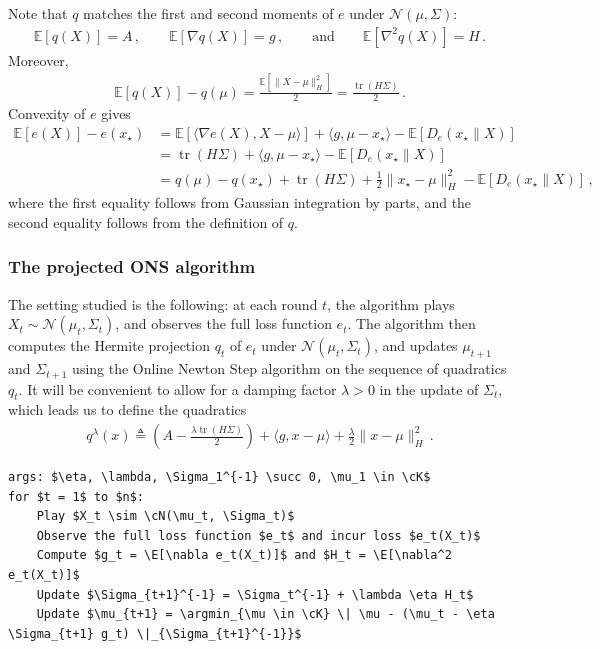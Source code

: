 \documentclass{article}
\theoremstyle{plain}
\theoremstyle{definition}
\theoremstyle{plain}
\newcommand{\tr}{\operatorname{tr}}
\newcommand{\argmin}{\operatornamewithlimits{arg\,min}}
\newcommand{\E}{\mathbb E}
\newcommand{\cN}{\mathcal N}
\newcommand{\cK}{\mathcal K}
\begin{document}
Note that $q$ matches the first and second moments of $e$ under $\cN(\mu, \Sigma)$:
\begin{align}
    \E[q(X)]           = A\,, \qquad
    \E[\nabla q(X)]    = g\,, \qquad\text{and}\qquad
    \E[\nabla^2 q(X)]  = H\,.
\end{align}
Moreover,
\begin{align}
    \E[q(X)] - q(\mu) = \frac{\E[\|X-\mu\|^2_H]}{2} = \frac{\tr(H\Sigma)}{2}\,.
\end{align}
Convexity of $e$ gives
\begin{align}
    \E[e(X)] - e(x_\star)
     & =
    \E\left[\langle \nabla e(X), X - \mu\rangle\right] + \langle g, \mu - x_\star\rangle
    - \E[D_e(x_\star \| X)]
    \label{eq:regret_switch_convex}
    \\
     & =
    \tr(H\Sigma) + \langle g, \mu - x_\star\rangle - \E[D_e(x_\star \| X)]
    \\
     & =
    q(\mu) - q(x_\star) + \tr(H\Sigma) + \frac12 \|x_\star - \mu\|^2_H - \E[D_e(x_\star \| X)]
    \,,
    \label{eq:quadratic_regret_switch}
\end{align}
where the first equality follows from Gaussian integration by parts,
and the second equality follows from the definition of $q$.

\subsubsection{The projected ONS algorithm}
The setting studied is the following: at each round $t$, the algorithm plays $X_t \sim \cN(\mu_t, \Sigma_t)$, and observes the full loss function $e_t$.
The algorithm then computes the Hermite projection $q_t$ of $e_t$ under $\cN(\mu_t, \Sigma_t)$, and updates $\mu_{t+1}$ and $\Sigma_{t+1}$ using the Online Newton Step algorithm on the sequence of quadratics $q_t$.
It will be convenient to allow for a damping factor $\lambda > 0$ in the update of $\Sigma_t$, which leads us to define the quadratics
\begin{align}
    q^\lambda(x) \triangleq \left(A - \frac{\lambda \tr(H\Sigma)}{2}\right) + \langle g, x-\mu\rangle + \frac{\lambda}{2}\|x-\mu\|^2_{H}\,.
\end{align}
\begin{algorithm}[h!]
    \begin{minipage}{13cm}
        \begin{mdframed}
            \begin{lstlisting}
args: $\eta, \lambda, \Sigma_1^{-1} \succ 0, \mu_1 \in \cK$
for $t = 1$ to $n$:
    Play $X_t \sim \cN(\mu_t, \Sigma_t)$
    Observe the full loss function $e_t$ and incur loss $e_t(X_t)$
    Compute $g_t = \E[\nabla e_t(X_t)]$ and $H_t = \E[\nabla^2 e_t(X_t)]$
    Update $\Sigma_{t+1}^{-1} = \Sigma_t^{-1} + \lambda \eta H_t$
    Update $\mu_{t+1} = \argmin_{\mu \in \cK} \| \mu - (\mu_t - \eta \Sigma_{t+1} g_t) \|_{\Sigma_{t+1}^{-1}}$
\end{lstlisting}
            \caption{Hermite-ONS algorithm.}\label{alg:HermiteOnlineNewtonStep}
        \end{mdframed}
    \end{minipage}
\end{algorithm}
\end{document}
